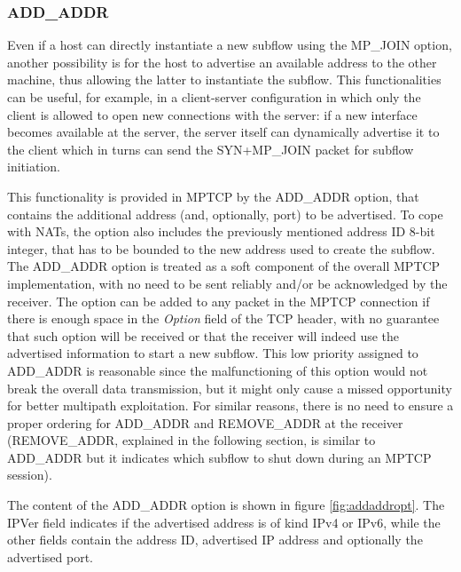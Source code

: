 
\subsubsection{ADD\_ADDR}
Even if a host can directly instantiate a new subflow using the MP\_JOIN option, another possibility is for the host to advertise an available address to the other machine, thus allowing the latter to instantiate the subflow.
This functionalities can be useful, for example, in a client-server configuration in which only the client is allowed to open new connections with the server: if a new interface becomes available at the server, the server itself can dynamically advertise it to the client which in turns can send the SYN+MP\_JOIN packet for subflow initiation.

This functionality is provided in MPTCP by the ADD\_ADDR option, that contains the additional address (and, optionally, port) to be advertised. To cope with NATs, the option also includes the previously mentioned address ID 8-bit integer, that has to be bounded to the new address used to create the subflow.
The ADD\_ADDR option is treated as a soft component of the overall MPTCP implementation, with no need to be sent reliably and/or be acknowledged by the receiver. The option can be added to any packet in the MPTCP connection if there is enough space in the \textit{Option} field of the TCP header, with no guarantee that such option will be received or that the receiver will indeed use the advertised information to start a new subflow. This low priority assigned to ADD\_ADDR is reasonable since the malfunctioning of this option would not break the overall data transmission, but it might only cause a missed opportunity for better multipath exploitation. For similar reasons, there is no need to ensure a proper ordering for ADD\_ADDR and REMOVE\_ADDR at the receiver (REMOVE\_ADDR, explained in the following section, is similar to ADD\_ADDR but it indicates which subflow to shut down during an MPTCP session). 

The content of the ADD\_ADDR option is shown in figure \ref{fig:addaddropt}. The IPVer field indicates if the advertised address is of kind IPv4 or IPv6, while the other fields contain the address ID, advertised IP address and optionally the advertised port.

